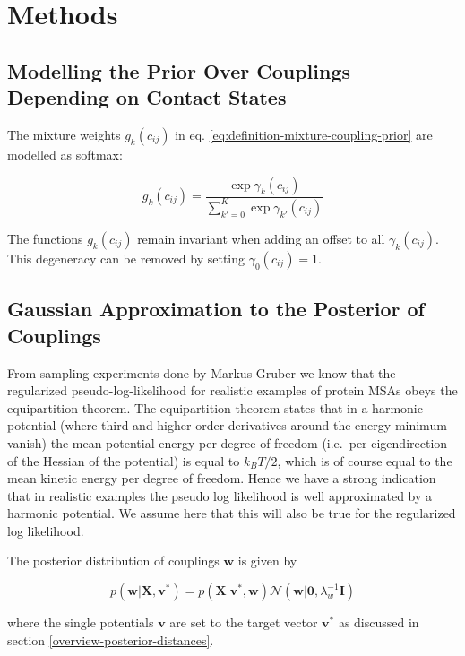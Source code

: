 \documentclass[11pt,a4paper,twoside]{book}
\newcommand{\Gauss}{\mathcal{N}}
\newcommand{\I}{\mathbf{I}}
\newcommand{\cij}{c_{ij}}
\renewcommand{\v}{\mathbf{v}}
\newcommand{\w}{\mathbf{w}}
\newcommand{\X}{\mathbf{X}}
\theoremstyle{definition}
\theoremstyle{definition}
\theoremstyle{remark}
\begin{document}
\newpage

\section{Methods}\label{methods-3}

\subsection{Modelling the Prior Over Couplings Depending on Contact
States}\label{methods-coupling-prior}

The mixture weights \(g_k(\cij)\) in eq.
\eqref{eq:definition-mixture-coupling-prior} are modelled as softmax:

\begin{equation}
    g_k(\cij) = \frac{\exp \gamma_k(\cij)}{\sum_{k'=0}^K \exp \gamma_{k'}(\cij)} 
\label{eq:def-g-k-binary}
\end{equation}

The functions \(g_k(\cij)\) remain invariant when adding an offset to
all \(\gamma_k(\cij)\). This degeneracy can be removed by setting
\(\gamma_0(\cij)=1\).

\subsection{Gaussian Approximation to the Posterior of
Couplings}\label{laplace-approx}

From sampling experiments done by Markus Gruber we know that the
regularized pseudo-log-likelihood for realistic examples of protein MSAs
obeys the equipartition theorem. The equipartition theorem states that
in a harmonic potential (where third and higher order derivatives around
the energy minimum vanish) the mean potential energy per degree of
freedom (i.e.~per eigendirection of the Hessian of the potential) is
equal to \(k_B T/2\), which is of course equal to the mean kinetic
energy per degree of freedom. Hence we have a strong indication that in
realistic examples the pseudo log likelihood is well approximated by a
harmonic potential. We assume here that this will also be true for the
regularized log likelihood.

The posterior distribution of couplings \(\w\) is given by

\begin{equation}
p(\w | \X , \v^*) = p(\X | \v^*, \w) \Gauss (\w | \mathbf{0}, \lambda_w^{-1} \I)
\end{equation}

where the single potentials \(\v\) are set to the target vector \(\v^*\)
as discussed in section \ref{overview-posterior-distances}.
\end{document}
